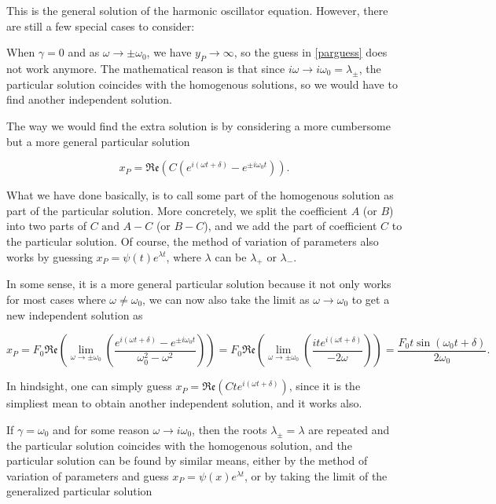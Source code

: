\documentclass[english,a4paper,12pt]{report}
\begin{document}
This is the general solution of the harmonic oscillator equation. However, there are still a few special cases to consider:

When \(\gamma = 0\) and as \(\omega \to \pm \omega _{0}\), we have \(y_{P} \to \infty  \), so the guess in \cref{parguess} does not work anymore. The mathematical reason is that since \(i \omega \to  i \omega _{0} = \lambda _{\pm } \), the particular solution coincides with the homogenous solutions, so we would have to find another independent solution. 

The way we would find the extra solution is by considering a more cumbersome but a more general particular solution 

\begin{equation}
    x_{P} =  \mathfrak{Re} (C(e^{i(\omega t+\delta )} - e^{\pm i\omega _{0}t  } ) ). 
\end{equation}

What we have done basically, is to call some part of the homogenous solution as part of the particular solution. More concretely, we split the coefficient \(A \) (or \(B\)) into two parts of \(C \text { and } A-C\) (or \(B-C\)), and we add the part of coefficient \(C\) to the particular solution. Of course, the method of variation of parameters also works by guessing \(x_{P} = \psi (t)e^{\lambda t}\), where \(\lambda \) can be \(\lambda _{+} \text { or } \lambda _{-}  \).

In some sense, it is a more general particular solution because it not only works for most cases where \(\omega \neq \omega _{0} \), we can now also take the limit as \(\omega \to \omega _{0} \) to get a new independent solution as   


\begin{equation}
    x_{P} = F_0 \mathfrak{Re} \left( \lim_{\omega  \to \pm \omega _{0}  } \left(  \frac{e^{i (\omega t+\delta )} - e^{\pm i \omega _{0}  t }  }{\omega _{0}^2-\omega ^2 } \right)\right) = F_0 \mathfrak{Re} \left( \lim_{\omega  \to \pm \omega _{0} } \left(\frac{ite^{i (\omega t+\delta )} }{-2\omega } \right) \right)= \frac{F_0 t \sin (\omega _{0}t +\delta )}{2 \omega _{0} }.
\end{equation}

In hindsight, one can simply guess \(x_{P} = \mathfrak{Re} (Cte^{i(\omega t+\delta )} )  \), since it is the simpliest mean to obtain another independent solution, and it works also. 

If \(\gamma = \omega _{0} \) and for some reason \(\omega \to i\omega _{0}\), then the roots \(\lambda _{\pm } = \lambda  \) are repeated and the particular solution coincides with the homogenous solution, and the particular solution can be found by similar means, either by the method of variation of parameters and guess \(x_{P} = \psi (x)e^{\lambda t}  \), or by taking the limit of the generalized particular solution
\end{document}
